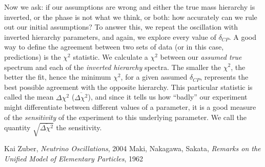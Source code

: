\documentclass[10pt, a4paper]{article}
\begin{document}
Now we ask: if our assumptions are wrong and either the true mass hierarchy is
inverted, or the phase is not what we think, or both: how accurately can we
rule out our initial assumptions? To answer this, we repeat the oscillation
with inverted hierarchy parameters, and again, we explore every value of
$\delta_{CP}$. A good way to define the agreement between two sets of data (or
in this case, predictions) is the $\chi^2$ statistic. We calculate a $\chi^2$
between our \emph{assumed true} spectrum and each of the \emph{inverted
hierarchy} spectra. The smaller the $\chi^2$, the better the fit, hence the
minimum $\chi^2$, for a given assumed $\delta_{CP}$, represents the best
possible agreement with the opposite hierarchy. This particular statistic is
called the mean $\Delta\chi^2$ ($\overline{\Delta\chi^2}$), and since it tells
us how ``badly'' our experiment might differentiate between different values of
a parameter,  it is a good measure of the \emph{sensitivity} of the experiment
to this underlying parameter.  We call the quantity
$\sqrt{\overline{\Delta\chi^2}}$ the sensitivity.


\begin{thebibliography}{20} 
	 Kai Zuber, \textit{Neutrino
		Oscillations}, 2004
	 Maki, Nakagawa, Sakata, \textit{Remarks on the Unified Model of
		Elementary Particles}, 1962
	
\end{thebibliography}
\end{document}
